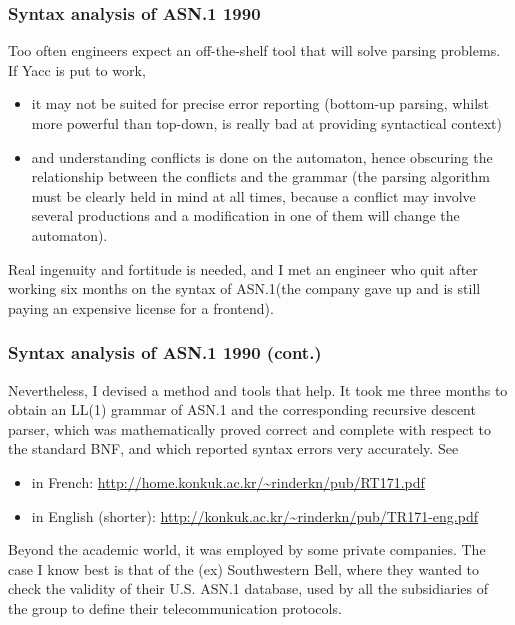 \documentclass[compress,dvips,xcolor={dvipsnames},t]{beamer}
\newcommand\ASN{\textsf{ASN.1}\xspace}
\begin{document}

\begin{frame}
\frametitle{Syntax analysis of \ASN 1990}

Too often engineers expect an off-the-shelf tool that will solve
parsing problems. If Yacc is put to work, 
\begin{itemize}

\item it may not be suited for precise error reporting (bottom-up
  parsing, whilst more powerful than top-down, is really bad at
  providing syntactical context)

\item and understanding conflicts is done on the automaton, hence
  obscuring the relationship between the conflicts and the grammar
  (the parsing algorithm must be clearly held in mind at all times,
  because a conflict may involve several productions and a
  modification in one of them will change the automaton).

\end{itemize}

\bigskip

Real ingenuity and fortitude is needed, and I met an engineer who quit
after working six months on the syntax of \ASN (the company gave up
and is still paying an expensive license for a frontend).

\end{frame}


\begin{frame}
\frametitle{Syntax analysis of \ASN 1990 (cont.)}

Nevertheless, I devised a method and tools that help. It took me three
months to obtain an LL(1) grammar of \ASN and the corresponding
recursive descent parser, which was mathematically proved correct and
complete with respect to the standard BNF, and which reported syntax
errors very accurately. See
\begin{itemize}

  \item in French: 
{\small\url{http://home.konkuk.ac.kr/~rinderkn/pub/RT171.pdf}}

  \item in English (shorter):
{\small\url{http://konkuk.ac.kr/~rinderkn/pub/TR171-eng.pdf}}

\end{itemize}
Beyond the academic world, it was employed by some private
companies. The case I know best is that of the (ex) Southwestern Bell,
where they wanted to check the validity of their U.S. \ASN database,
used by all the subsidiaries of the group to define their
telecommunication protocols.

\end{frame}
\end{document}

